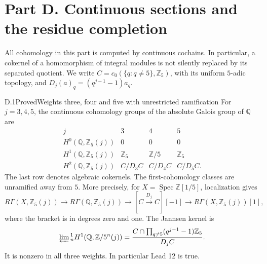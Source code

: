 \section*{Part D. Continuous sections and the residue completion}

All cohomology in this part is computed by continuous cochains. In
particular, a cokernel of a homomorphism of integral modules is not
silently replaced by its separated quotient. We write
\(C=c_0(\{q:q\ne5\},\mathbb Z_5)\), with its uniform \(5\)-adic
topology, and \(D_j(a)_q=(q^{j-1}-1)a_q\).

\begin{statement}{D.1}{Proved}{Weights three, four and five with unrestricted ramification}
For \(j=3,4,5\), the continuous cohomology groups of the absolute
Galois group of \(\mathbb Q\) are
\[
\begin{array}{c|ccc}
j&3&4&5\\\hline
H^0(\mathbb Q,\mathbb Z_5(j))&0&0&0\\
H^1(\mathbb Q,\mathbb Z_5(j))&\mathbb Z_5&\mathbb Z/5&\mathbb Z_5\\
H^2(\mathbb Q,\mathbb Z_5(j))&C/D_3C&C/D_4C&C/D_5C.
\end{array}
\]
The last row denotes algebraic cokernels. The first-cohomology
classes are unramified away from \(5\). More precisely, for
\(X=\operatorname{Spec}\mathbb Z[1/5]\), localization gives
\[
R\Gamma(X,\mathbb Z_5(j))\longrightarrow
R\Gamma(\mathbb Q,\mathbb Z_5(j))\longrightarrow
[C\xrightarrow{D_j}C][-1]\longrightarrow R\Gamma(X,\mathbb Z_5(j))[1],
\]
where the bracket is in degrees zero and one. The Jannsen kernel is
\[
\varprojlim{}^1_n H^1(\mathbb Q,\mathbb Z/5^n(j))
=\frac{C\cap\prod_{q\ne5}(q^{j-1}-1)\mathbb Z_5}{D_jC}.
\]
It is nonzero in all three weights. In particular Lead 12 is true.
\end{statement}
